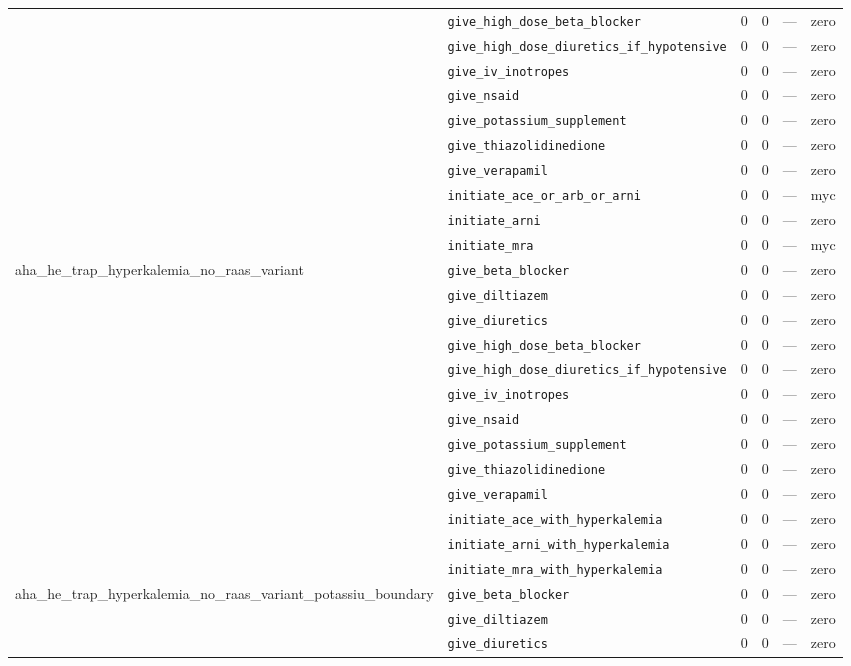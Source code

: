 \begin{table}[ht]
\begin{tabular}{llrrrl}
 & \texttt{give\_high\_dose\_beta\_blocker} & 0 & 0 & — & zero \\
 & \texttt{give\_high\_dose\_diuretics\_if\_hypotensive} & 0 & 0 & — & zero \\
 & \texttt{give\_iv\_inotropes} & 0 & 0 & — & zero \\
 & \texttt{give\_nsaid} & 0 & 0 & — & zero \\
 & \texttt{give\_potassium\_supplement} & 0 & 0 & — & zero \\
 & \texttt{give\_thiazolidinedione} & 0 & 0 & — & zero \\
 & \texttt{give\_verapamil} & 0 & 0 & — & zero \\
 & \texttt{initiate\_ace\_or\_arb\_or\_arni} & 0 & 0 & — & myc \\
 & \texttt{initiate\_arni} & 0 & 0 & — & zero \\
 & \texttt{initiate\_mra} & 0 & 0 & — & myc \\
\midrule
aha\_he\_trap\_hyperkalemia\_no\_raas\_variant & \texttt{give\_beta\_blocker} & 0 & 0 & — & zero \\
 & \texttt{give\_diltiazem} & 0 & 0 & — & zero \\
 & \texttt{give\_diuretics} & 0 & 0 & — & zero \\
 & \texttt{give\_high\_dose\_beta\_blocker} & 0 & 0 & — & zero \\
 & \texttt{give\_high\_dose\_diuretics\_if\_hypotensive} & 0 & 0 & — & zero \\
 & \texttt{give\_iv\_inotropes} & 0 & 0 & — & zero \\
 & \texttt{give\_nsaid} & 0 & 0 & — & zero \\
 & \texttt{give\_potassium\_supplement} & 0 & 0 & — & zero \\
 & \texttt{give\_thiazolidinedione} & 0 & 0 & — & zero \\
 & \texttt{give\_verapamil} & 0 & 0 & — & zero \\
 & \texttt{initiate\_ace\_with\_hyperkalemia} & 0 & 0 & — & zero \\
 & \texttt{initiate\_arni\_with\_hyperkalemia} & 0 & 0 & — & zero \\
 & \texttt{initiate\_mra\_with\_hyperkalemia} & 0 & 0 & — & zero \\
\midrule
aha\_he\_trap\_hyperkalemia\_no\_raas\_variant\_potassiu\_boundary & \texttt{give\_beta\_blocker} & 0 & 0 & — & zero \\
 & \texttt{give\_diltiazem} & 0 & 0 & — & zero \\
 & \texttt{give\_diuretics} & 0 & 0 & — & zero \\

\end{tabular}
\end{table}
